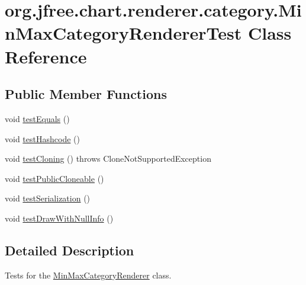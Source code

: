 \hypertarget{classorg_1_1jfree_1_1chart_1_1renderer_1_1category_1_1_min_max_category_renderer_test}{}\section{org.\+jfree.\+chart.\+renderer.\+category.\+Min\+Max\+Category\+Renderer\+Test Class Reference}
\label{classorg_1_1jfree_1_1chart_1_1renderer_1_1category_1_1_min_max_category_renderer_test}
\subsection*{Public Member Functions}
\begin{DoxyCompactItemize}
\item 
void \mbox{\hyperlink{classorg_1_1jfree_1_1chart_1_1renderer_1_1category_1_1_min_max_category_renderer_test_aa1c348d0cc21f314f73bdf7cc545f408}{test\+Equals}} ()
\item 
void \mbox{\hyperlink{classorg_1_1jfree_1_1chart_1_1renderer_1_1category_1_1_min_max_category_renderer_test_a2a7ba330ddb0ed58039f33c21083426b}{test\+Hashcode}} ()
\item 
void \mbox{\hyperlink{classorg_1_1jfree_1_1chart_1_1renderer_1_1category_1_1_min_max_category_renderer_test_a06291e120d8be6c55ae492e3292cd2b9}{test\+Cloning}} ()  throws Clone\+Not\+Supported\+Exception 
\item 
void \mbox{\hyperlink{classorg_1_1jfree_1_1chart_1_1renderer_1_1category_1_1_min_max_category_renderer_test_ae2c41e5494f176d0ee06ac32fd9564ef}{test\+Public\+Cloneable}} ()
\item 
void \mbox{\hyperlink{classorg_1_1jfree_1_1chart_1_1renderer_1_1category_1_1_min_max_category_renderer_test_a6d66aea344627c7345baa82014e7b8c5}{test\+Serialization}} ()
\item 
void \mbox{\hyperlink{classorg_1_1jfree_1_1chart_1_1renderer_1_1category_1_1_min_max_category_renderer_test_ab48b3af4992b8b50a835d290da9b335f}{test\+Draw\+With\+Null\+Info}} ()
\end{DoxyCompactItemize}


\subsection{Detailed Description}
Tests for the \mbox{\hyperlink{classorg_1_1jfree_1_1chart_1_1renderer_1_1category_1_1_min_max_category_renderer}{Min\+Max\+Category\+Renderer}} class. 

